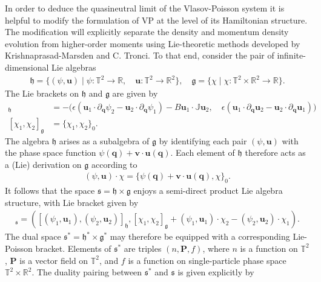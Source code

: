 \documentclass[%
 aip,
 amsmath,amssymb,
reprint, onecolumn %
]{revtex4-1}
\begin{document}
In order to deduce the quasineutral limit of the Vlasov-Poisson system it is helpful to modify the formulation of VP at the level of its Hamiltonian structure.  The modification will explicitly separate the density and momentum density evolution from higher-order moments using Lie-theoretic methods developed by Krishnaprasad-Marsden\cite{krishnaprasad_hamiltonian_1987} and C. Tronci\cite{tronci_hamiltonian_2010}. To that end, consider the pair of infinite-dimensional Lie algebras
\begin{align*}
\mathfrak{h} = \{(\psi,\bm{u})\mid \psi:\mathbb{T}^2\rightarrow \mathbb{R},\quad \bm{u}:\mathbb{T}^2\rightarrow\mathbb{R}^2\},\quad \mathfrak{g} = \{\chi\mid \chi:\mathbb{T}^2\times\mathbb{R}^2\rightarrow\mathbb{R}\}.
\end{align*}
The Lie brackets on $\mathfrak{h}$ and $\mathfrak{g}$ are given by
\begin{align*}
[(\psi_1,\bm{u}_1),(\psi_2,\bm{u}_2)]_{\mathfrak{h}} &= -\bigg(\epsilon\left(\bm{u}_1\cdot\partial_{\bm{q}}\psi_2 - \bm{u}_2\cdot\partial_{\bm{q}}\psi_1\right) - B\bm{u}_1\cdot\mathbb{J}\bm{u}_2,\quad\epsilon\left(\bm{u}_1\cdot\partial_{\bm{q}}\bm{u}_2 - \bm{u}_2\cdot\partial_{\bm{q}}\bm{u}_1\right)\bigg)\\
[\chi_1,\chi_2]_{\mathfrak{g}} &=\{\chi_1,\chi_2\}_0.
\end{align*}
The algebra $\mathfrak{h}$ arises as a subalgebra of $\mathfrak{g}$ by identifying each pair $(\psi,\bm{u})$ with the phase space function $\psi(\bm{q})+ \bm{v}\cdot\bm{u}(\bm{q})$. Each element of $\mathfrak{h}$ therefore acts as a (Lie) derivation on $\mathfrak{g}$ according to
\begin{align*}
(\psi,\bm{u})\cdot\chi = \{\psi(\bm{q}) + \bm{v}\cdot\bm{u}(\bm{q}),\chi\}_0.
\end{align*}
It follows that the space $\mathfrak{s} = \mathfrak{h}\times\mathfrak{g}$ enjoys a semi-direct product Lie algebra structure, with Lie bracket given by
\begin{align*}
[((\psi_1,\bm{u}_1),\chi_1),((\psi_2,\bm{u}_2),\chi_2)]_{\mathfrak{s}} = ([(\psi_1,\bm{u}_1),(\psi_2,\bm{u}_2)]_{\mathfrak{h}},[\chi_1,\chi_2]_{\mathfrak{g}} + (\psi_1,\bm{u}_1)\cdot \chi_2 - (\psi_2,\bm{u}_2)\cdot \chi_1).
\end{align*}
The dual space $\mathfrak{s}^* = \mathfrak{h}^*\times\mathfrak{g}^*$ may therefore be equipped with a corresponding Lie-Poisson bracket. Elements of $\mathfrak{s}^*$ are triples $(n,\bm{P},f)$, where $n$ is a function on $\mathbb{T}^2$, $\bm{P}$ is a vector field on $\mathbb{T}^2$, and $f$ is a function on single-particle phase space $\mathbb{T}^2\times\mathbb{R}^2$. The duality pairing between $\mathfrak{s}^*$ and $\mathfrak{s}$ is given explicitly by
\end{document}
